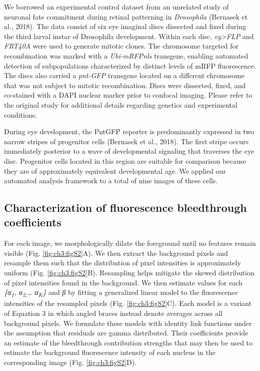 We borrowed an experimental control dataset from an unrelated study of neuronal fate commitment during retinal patterning in \emph{Drosophila} (Bernasek et al., 2018). The data consist of six eye imaginal discs dissected and fixed during the third larval instar of Drosophila development. Within each disc, \emph{ey\textgreater{}FLP} and \emph{FRT40A} were used to generate mitotic clones. The chromosome targeted for recombination was marked with a \emph{Ubi-mRFPnls} transgene, enabling automated detection of subpopulations characterized by distinct levels of mRFP fluorescence. The discs also carried a \emph{pnt-GFP} transgene located on a different chromosome that was not subject to mitotic recombination. Discs were dissected, fixed, and co-stained with a DAPI nuclear marker prior to confocal imaging. Please refer to the original study for additional details regarding genetics and experimental conditions.

During eye development, the PntGFP reporter is predominantly expressed in two narrow stripes of progenitor cells (Bernasek et al., 2018). The first stripe occurs immediately posterior to a wave of developmental signaling that traverses the eye disc. Progenitor cells located in this region are suitable for comparison because they are of approximately equivalent developmental age. We applied our automated analysis framework to a total of nine images of these cells.

\subsection{Characterization of fluorescence bleedthrough coefficients}

For each image, we morphologically dilate the foreground until no features remain visible (Fig. \ref{fig:ch3:figS2}A). We then extract the background pixels and resample them such that the distribution of pixel intensities is approximately uniform (Fig. \ref{fig:ch3:figS2}B). Resampling helps mitigate the skewed distribution of pixel intensities found in the background. We then estimate values for each \emph{\{α\textsubscript{1}, α\textsubscript{2,}\ldots{} α\textsubscript{K}\}} and \emph{β} by fitting a generalized linear model to the fluorescence intensities of the resampled pixels (Fig. \ref{fig:ch3:figS2}C). Each model is a variant of Equation 3 in which angled braces instead denote averages across all background pixels. We formulate these models with identity link functions under the assumption that residuals are gamma distributed. Their coefficients provide an estimate of the bleedthrough contribution strengths that may then be used to estimate the background fluorescence intensity of each nucleus in the corresponding image (Fig. \ref{fig:ch3:figS2}D).

